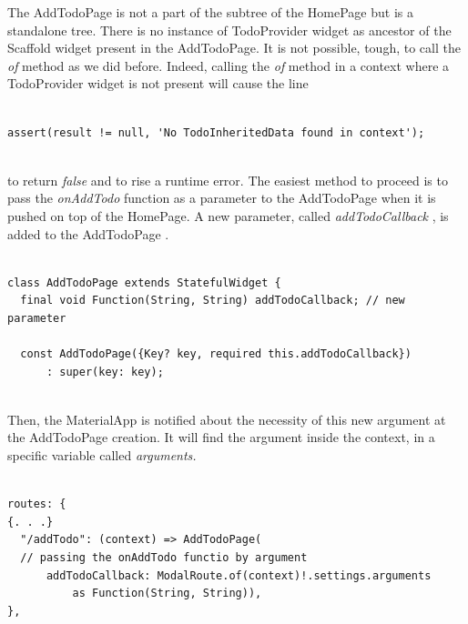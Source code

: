The AddTodoPage is not a part of the subtree of the HomePage but is a standalone tree. There is no instance of TodoProvider widget as ancestor of the  Scaffold widget present in the AddTodoPage. It is not possible, tough, to call the \textit{of} method as  we did before. Indeed, calling the \textit{of} method in a context where a TodoProvider widget is not present will cause the line
\mbox{}\\

\begin{code}
\begin{verbatim}

assert(result != null, 'No TodoInheritedData found in context');
\end{verbatim}
\end{code}
\mbox{}\\
to return \textit{false} and to rise a runtime error. The easiest method to proceed is to pass the \textit{onAddTodo} function as a parameter to the AddTodoPage when it is pushed on top of the HomePage. A new parameter, called \textit{addTodoCallback }, is added to the AddTodoPage .
\mbox{}\\
\mbox{}
\begin{code}
\label{code:2.34}
\begin{verbatim}

class AddTodoPage extends StatefulWidget {
  final void Function(String, String) addTodoCallback; // new parameter

  const AddTodoPage({Key? key, required this.addTodoCallback})
      : super(key: key);
\end{verbatim}
\end{code}
\mbox{}\\
Then, the MaterialApp is notified about the necessity of this new argument at the AddTodoPage creation. It will find the argument inside the context, in a specific variable called \textit{arguments.}
\mbox{}\\
\mbox{}
\begin{code}
\label{code:2.36}
\begin{verbatim}

routes: {
{. . .}
  "/addTodo": (context) => AddTodoPage( 
  // passing the onAddTodo functio by argument
      addTodoCallback: ModalRoute.of(context)!.settings.arguments
          as Function(String, String)),
},

\end{verbatim}
\end{code}
